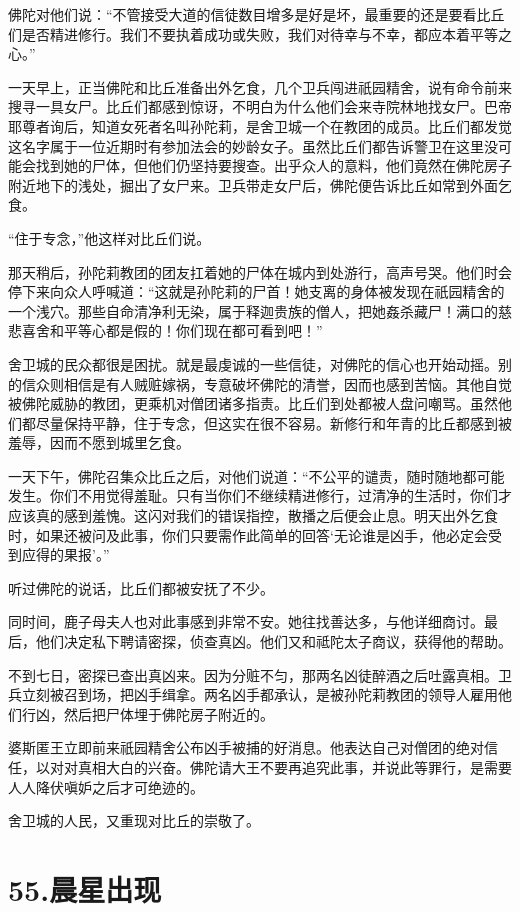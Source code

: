 \documentclass[12pt,twoside,openany]{book}
\begin{document}
佛陀对他们说：“不管接受大道的信徒数目增多是好是坏，最重要的还是要看比丘们是否精进修行。我们不要执着成功或失败，我们对待幸与不幸，都应本着平等之心。”

一天早上，正当佛陀和比丘准备出外乞食，几个卫兵闯进祇园精舍，说有命令前来搜寻一具女尸。比丘们都感到惊讶，不明白为什么他们会来寺院林地找女尸。巴帝耶尊者询后，知道女死者名叫孙陀莉，是舍卫城一个在教团的成员。比丘们都发觉这名字属于一位近期时有参加法会的妙龄女子。虽然比丘们都告诉警卫在这里没可能会找到她的尸体，但他们仍坚持要搜查。出乎众人的意料，他们竟然在佛陀房子附近地下的浅处，掘出了女尸来。卫兵带走女尸后，佛陀便告诉比丘如常到外面乞食。

“住于专念，”他这样对比丘们说。

那天稍后，孙陀莉教团的团友扛着她的尸体在城内到处游行，高声号哭。他们时会停下来向众人呼喊道：“这就是孙陀莉的尸首！她支离的身体被发现在祇园精舍的一个浅穴。那些自命清净利无染，属于释迦贵族的僧人，把她姦杀藏尸！满口的慈悲喜舍和平等心都是假的！你们现在都可看到吧！”

舍卫城的民众都很是困扰。就是最虔诚的一些信徒，对佛陀的信心也开始动摇。别的信众则相信是有人贼赃嫁祸，专意破坏佛陀的清誉，因而也感到苦恼。其他自觉被佛陀威胁的教团，更乘机对僧团诸多指责。比丘们到处都被人盘问嘲骂。虽然他们都尽量保持平静，住于专念，但这实在很不容易。新修行和年青的比丘都感到被羞辱，因而不愿到城里乞食。

一天下午，佛陀召集众比丘之后，对他们说道：“不公平的谴责，随时随地都可能发生。你们不用觉得羞耻。只有当你们不继续精进修行，过清净的生活时，你们才应该真的感到羞愧。这闪对我们的错误指控，散播之后便会止息。明天出外乞食时，如果还被问及此事，你们只要需作此简单的回答‘无论谁是凶手，他必定会受到应得的果报’。”

听过佛陀的说话，比丘们都被安抚了不少。

同时间，鹿子母夫人也对此事感到非常不安。她往找善达多，与他详细商讨。最后，他们决定私下聘请密探，侦查真凶。他们又和祗陀太子商议，获得他的帮助。

不到七日，密探已查出真凶来。因为分赃不匀，那两名凶徒醉酒之后吐露真相。卫兵立刻被召到场，把凶手缉拿。两名凶手都承认，是被孙陀莉教团的领导人雇用他们行凶，然后把尸体埋于佛陀房子附近的。

婆斯匿王立即前来祇园精舍公布凶手被捕的好消息。他表达自己对僧团的绝对信任，以对对真相大白的兴奋。佛陀请大王不要再追究此事，并说此等罪行，是需要人人降伏嗔妒之后才可绝迹的。

舍卫城的人民，又重现对比丘的崇敬了。


\chapter{55.晨星出现}\label{ch55}
\end{document}
